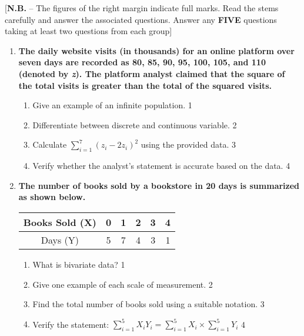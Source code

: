 \documentclass{article}
\begin{document}
\begin{center}
[\textbf{N.B.} – The figures of the right margin indicate full marks. Read the stems carefully and answer the associated questions. Answer any \textbf{FIVE} questions taking at least two questions from each group]\\


\end{center}
  \begin{enumerate}
  
  \item  
\textbf{The daily website visits (in thousands) for an online platform over seven days are recorded as 80, 85, 90, 95, 100, 105, and 110 (denoted by \textit{z}). The platform analyst claimed that the square of the total visits is greater than the total of the squared visits.}

\begin{enumerate}
    \item Give an example of an infinite population. \hfill 1
    \item Differentiate between discrete and continuous variable. \hfill 2
    \item  
    Calculate $\displaystyle \sum_{i=1}^7 (z_i - 2z_i)^2$ using the provided data. \hfill 3
    \item
    Verify whether the analyst’s statement is accurate based on the data. \hfill 4
\end{enumerate}

\item
\textbf{The number of books sold by a bookstore in 20 days is summarized as shown below.}

\begin{table}[h]
\centering
\begin{tabular}{|c|ccccc|}
Books Sold (X) & 0 & 1 & 2 & 3 & 4 \\ \hline
Days (Y) & 5 & 7 & 4 & 3 & 1
\end{tabular}
\end{table}

\begin{enumerate}
    \item What is bivariate data? \hfill 1
    \item Give one example of each scale of measurement. \hfill 2
    \item  
    Find the total number of books sold using a suitable notation. \hfill 3
    \item
    Verify the statement: $\displaystyle \sum_{i=1}^{5} X_iY_i = \sum_{i=1}^{5} X_i \times \sum_{i=1}^{5} Y_i$ \hfill 4
\end{enumerate}


\end{enumerate}
\end{document}
